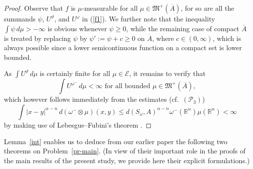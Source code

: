 \documentclass[12pt,a4paper,reqno]{amsart} %
\theoremstyle{lause}
\theoremstyle{maaritelma}
\theoremstyle{lause}
\theoremstyle{maaritelma}
\numberwithin{equation}{section}
\begin{document}
\begin{proof}
Observe that $f$ is $\mu$-measurable for all $\mu\in\mathfrak M^+(\overline{A})$, for so are all the summands $\psi$, $U^\vartheta$, and $U^\omega$ in (\ref{f1}). We further note that the inequality $\int\psi\,d\mu>-\infty$ is obvious whenever $\psi\geqslant0$, while the remaining case of compact $\overline{A}$ is treated by replacing $\psi$ by $\psi':=\psi+c\geqslant0$ on $\overline{A}$, where $c\in(0,\infty)$, which is always possible since a lower semicontinuous function on a compact set is lower bounded.

As $\int U^\vartheta\,d\mu$ is certainly finite for all $\mu\in\mathcal E$, it remains to verify that
\[\int U^{\omega^-}\,d\mu<\infty\text{ \ for all bounded $\mu\in\mathfrak M^+(\overline{A})$},\]
which however follows immediately from the estimates (cf.\ $(\mathcal P_3)$)
\begin{equation}\label{estme}
\int|x-y|^{\alpha-n}\,d(\omega^-\otimes\mu)(x,y)\leqslant d(S_\omega,A)^{\alpha-n}\omega^-(\mathbb R^n)\mu(\mathbb R^n)<\infty
\end{equation}
by making use of Lebesgue--Fubini's theorem \cite[Section~V.8, Theorem~1(a)]{B2}.
\end{proof}

Lemma~\ref{int} enables us to deduce from our earlier paper \cite{Z5a} the following two theorems on Problem~\ref{pr-main}. (In view of their important role in the proofs of the main results of the present study, we provide here their explicit formulations.)
\end{document}
